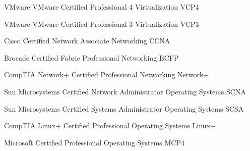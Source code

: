 \begin{cvhonors}
\cvhonor
{VMware} %
{VMware Certified Professional 4} %
{Virtualization} %
{VCP4}


\cvhonor
{VMware} %
{VMware Certified Professional 3} %
{Virtualization} %
{VCP3}


\cvhonor
{Cisco} %
{Certified Network Associate} %
{Networking} %
{CCNA}


\cvhonor
{Brocade} %
{Certified Fabric Professional} %
{Networking} %
{BCFP}


\cvhonor
{CompTIA} %
{Network+ Certified Professional} %
{Networking} %
{Network+}


\cvhonor
{Sun Microsystems} %
{Certified Network Administrator} %
{Operating Systems} %
{SCNA}


\cvhonor
{Sun Microsystems} %
{Certified Systems Administrator} %
{Operating Systems} %
{SCSA}


\cvhonor
{CompTIA} %
{Linux+ Certified Professional} %
{Operating Systems} %
{Linux+}


\cvhonor
{Microsoft} %
{Certified Professional} %
{Operating Systems} %
{MCP4}



\end{cvhonors}
